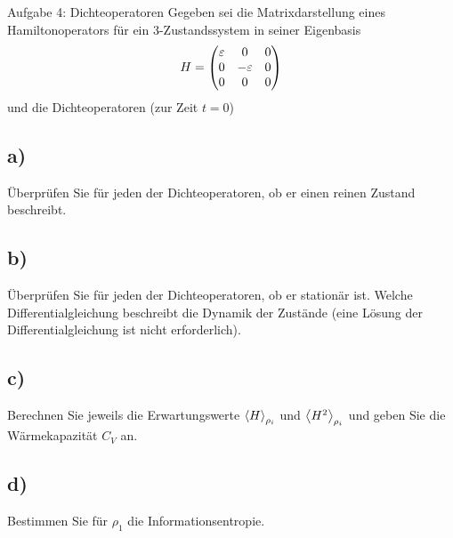 \begin{aufgabe}{Aufgabe 4: Dichteoperatoren}
    Gegeben sei die Matrixdarstellung eines Hamiltonoperators für ein 3-Zustandssystem in seiner Eigenbasis
    \[
        H = \begin{pmatrix}\varepsilon & 0 & 0 \\ 0 & -\varepsilon & 0 \\ 0 & 0 & 0\end{pmatrix}
    \]
    und die Dichteoperatoren (zur Zeit $t=0$)

    \subsection{a)}
    Überprüfen Sie für jeden der Dichteoperatoren, ob er einen reinen Zustand beschreibt.

    \subsection{b)}
    Überprüfen Sie für jeden der Dichteoperatoren, ob er stationär ist.
    Welche Differentialgleichung beschreibt die Dynamik der Zustände (eine Lösung der Differentialgleichung ist nicht erforderlich).

    \subsection{c)}
    Berechnen Sie jeweils die Erwartungswerte $\left\langle H\right\rangle_{\rho_i}$ und $\left\langle H^2\right\rangle_{\rho_i}$ und geben Sie die Wärmekapazität $C_V$ an.

    \subsection{d)}
    Bestimmen Sie für $\rho_1$ die Informationsentropie.
\end{aufgabe}

